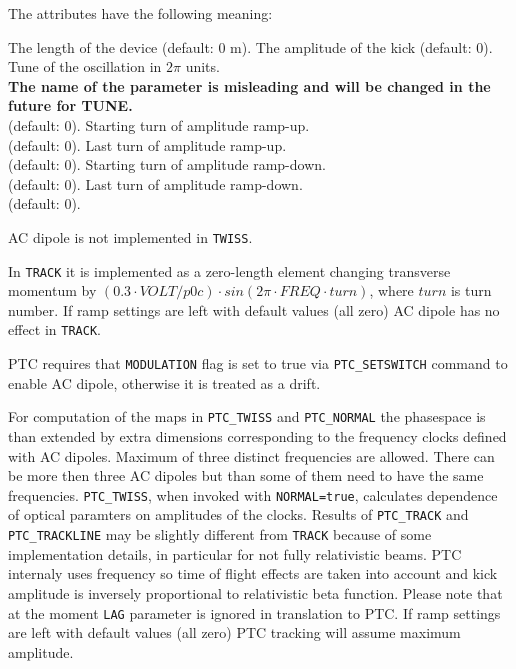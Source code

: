 The attributes have the following meaning:
\begin{madlist}
    The length of the device (default: 0 m).
    The amplitude of the kick
     (default: 0).
    Tune of the oscillation in $2\pi$ units. \\
     \textbf{The name of the parameter is misleading and will be changed in the future for TUNE.} \\
     (default: 0).
    Starting turn of amplitude ramp-up. \\
     (default: 0).
    Last turn of amplitude ramp-up. \\
     (default: 0).
    Starting turn of amplitude ramp-down. \\
     (default: 0).
    Last turn of amplitude ramp-down. \\
     (default: 0).
\end{madlist}


AC dipole is not implemented in \texttt{TWISS}.

In \texttt{TRACK} it is implemented as a zero-length element
changing transverse momentum by $(0.3 \cdot VOLT / p0c) \cdot sin(2\pi \cdot FREQ  \cdot turn)$,
where $turn$ is turn number. If ramp settings are left with default values (all zero)
AC dipole has no effect in \texttt{TRACK}.

PTC requires that \texttt{MODULATION} flag is set to true
via \texttt{PTC\_SETSWITCH} command to enable AC dipole,
otherwise it is treated as a drift.

For computation of the maps in \texttt{PTC\_TWISS} and \texttt{PTC\_NORMAL}
the phasespace is than extended by extra dimensions corresponding to
the frequency clocks defined with AC dipoles.
Maximum of three distinct frequencies are allowed.
There can be more then three AC dipoles but than some of them need to have
the same frequencies.
\texttt{PTC\_TWISS}, when invoked with \texttt{NORMAL=true}, calculates
dependence of optical paramters on amplitudes of the clocks.
Results of \texttt{PTC\_TRACK} and \texttt{PTC\_TRACKLINE}
may be slightly different from \texttt{TRACK} because of some implementation details,
in particular for not fully relativistic beams.
PTC internaly uses frequency so time of flight effects are taken into account
and kick amplitude is inversely proportional to relativistic beta function.
Please note that at the moment \texttt{LAG} parameter is ignored
in translation to PTC. If ramp settings are left with default values (all zero)
PTC tracking will assume maximum amplitude.


